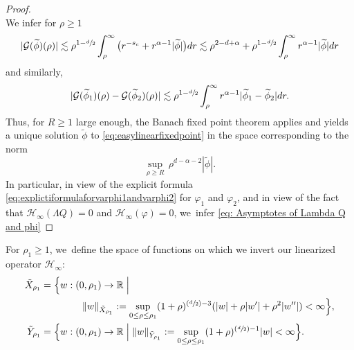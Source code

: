 \documentclass[JEP,XML,SOM,Unicode]{cedram}
\newcommand{\Psfrac}[2]{(\sfrac{#1}{#2})}
\let\ra\rightarrow
\theoremstyle{plain}
\theoremstyle{definition}
\begin{document}
\begin{proof}
\[\]
We infer for $\rho\geq 1$
\[
|\mathcal G(\widetilde{\phi})(\rho)| \lesssim \rho^{1-\sfrac{d}{2}}\int_\rho^\infty\big(r^{-s_c}+r^{\alpha-1}|\widetilde{\phi}|\big)dr\lesssim \rho^{2-d+\alpha}+\rho^{1-\sfrac{d}{2}}\int_\rho^\infty r^{\alpha-1}|\widetilde{\phi}| dr
\]
and similarly,
\[
|\mathcal G(\widetilde{\phi}_1)(\rho)-\mathcal G(\widetilde{\phi}_2)(\rho)| \lesssim \rho^{1-\sfrac{d}{2}}\int_\rho^\infty r^{\alpha-1}|\widetilde{\phi}_1-\widetilde{\phi}_2| dr.
\]
Thus, for $R\geq 1$ large enough, the Banach fixed point theorem applies and yields a unique solution $\widetilde{\phi}$ to \eqref{eq:easylinearfixedpoint} in the space corresponding to the norm
\[
\sup_{\rho\geq R}\,\rho^{d-\alpha-2}|\widetilde{\phi}|.
\]
In particular, in view of the explicit formula \eqref{eq:explictiformulaforvarphi1andvarphi2} for $\varphi_1$ and $\varphi_2$, and in view of the fact that $\mathcal H_\infty(\Lambda Q)=0$ and $\mathcal H_\infty(\varphi)=0$, we~infer \eqref{eq: Asymptotes of Lambda Q and phi}
\end{proof}

For $\rho_1\ge 1$, we~define the space of functions on which we invert our linearized operator $\mathcal H_\infty$:
\begin{equation}
\begin{aligned}
\tilde X_{\rho_1}&=\Big\{w:(0,\rho_1)\ra \mathbb R\Bigm|\\
&\hspace*{1.5cm}\Vert w\Vert_{\tilde X_{\rho_1}}:=\sup_{0\le \rho\le\rho_1}(1+\rho)^{\Psfrac{d}{2}-3}(|w|+\rho|w'|+\rho^2|w''|)<\infty\Big\},\\
\tilde Y_{\rho_1}&=\Big\{w:(0,\rho_1)\ra \mathbb R\Bigm|\Vert w\Vert_{\tilde Y_{\rho_1}}:=\sup_{0\le \rho\le\rho_1}(1+\rho)^{\Psfrac{d}{2}-1}|w|<\infty\Big\}.
\end{aligned}
\end{equation}
\end{document}
